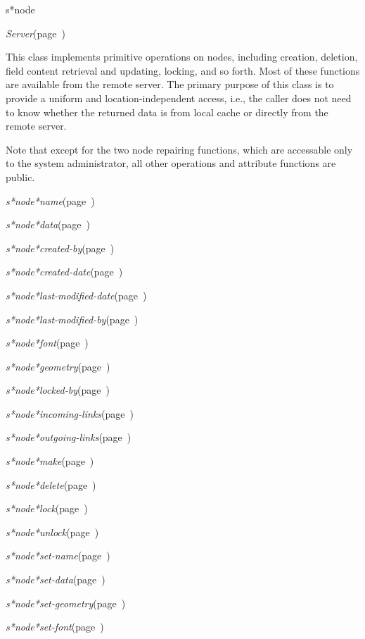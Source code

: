 \begin{description}
\item [Name:]  s*node

\item [Layer:] {\sl Server}\hfill(page~\pageref{Server})

\item [Description:]
This class implements primitive operations on nodes, including
creation, deletion, field content retrieval and updating,
locking, and so forth. Most of these functions are available from
the remote server. The primary purpose of this class is to
provide a uniform and location-independent access, i.e., the
caller does not need to know whether the returned data is from
local cache or directly from the remote server.

Note that except for the two node repairing functions, which are
accessable only to the system administrator, all other operations
and attribute functions are public. 

\item [Attributes:]
\item {\sl s*node*name}\hfill(page~\pageref{s*node*name})
\item {\sl s*node*data}\hfill(page~\pageref{s*node*data})
\item {\sl s*node*created-by}\hfill(page~\pageref{s*node*created-by})
\item {\sl s*node*created-date}\hfill(page~\pageref{s*node*created-date})
\item {\sl s*node*last-modified-date}\hfill(page~\pageref{s*node*last-modified-date})
\item {\sl s*node*last-modified-by}\hfill(page~\pageref{s*node*last-modified-by})
\item {\sl s*node*font}\hfill(page~\pageref{s*node*font})
\item {\sl s*node*geometry}\hfill(page~\pageref{s*node*geometry})
\item {\sl s*node*locked-by}\hfill(page~\pageref{s*node*locked-by})
\item {\sl s*node*incoming-links}\hfill(page~\pageref{s*node*incoming-links})
\item {\sl s*node*outgoing-links}\hfill(page~\pageref{s*node*outgoing-links})

\item [Operations:]
\item {\sl s*node*make}\hfill(page~\pageref{s*node*make})
\item {\sl s*node*delete}\hfill(page~\pageref{s*node*delete})
\item {\sl s*node*lock}\hfill(page~\pageref{s*node*lock})
\item {\sl s*node*unlock}\hfill(page~\pageref{s*node*unlock})
\item {\sl s*node*set-name}\hfill(page~\pageref{s*node*set-name})
\item {\sl s*node*set-data}\hfill(page~\pageref{s*node*set-data})
\item {\sl s*node*set-geometry}\hfill(page~\pageref{s*node*set-geometry})
\item {\sl s*node*set-font}\hfill(page~\pageref{s*node*set-font})


\end{description}

